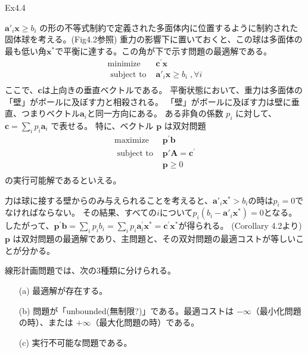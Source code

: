 \documentclass{jsarticle}
\begin{document}
Ex4.4\par 
$\bm{a}'_i\bm{x} \geq b_i$ の形の不等式制約で定義された多面体内に位置するように制約された固体球を考える。(Fig4.2参照) 
重力の影響下に置いておくと、この球は多面体の最も低い角$\bm{x}^*$で平衡に達する。この角が下で示す問題の最適解である。
\begin{equation}
  \begin{array}{cc}
  \operatorname{minimize} & \mathbf{c}^{\prime} \mathbf{x} \\
  \text { subject to } & \bm{a}'_i\bm{x} \geq b_i\;, \forall i\\
  \end{array}
\end{equation}
ここで、$\bm{c}$は上向きの垂直ベクトルである。
平衡状態において、重力は多面体の「壁」がボールに及ぼす力と相殺される。
「壁」がボールに及ぼす力は壁に垂直、つまりベクトル$\bm{a}_i$と同一方向にある。
ある非負の係数 $p_i$ に対して、$\bm{c} =\sum_i p_i\bm{a}_i$ で表せる。
特に、ベクトル $\bm{p}$ は双対問題
\begin{equation}
  \begin{array}{cc}
  \operatorname{maximize} & \mathbf{p}^{\prime} \mathbf{b} \\
  \text { subject to } & \mathbf{p'A}= \mathbf{c}^{\prime} \\
  & \bm{p}\geq 0\\
  \end{array}
\end{equation}
の実行可能解であるといえる。

力は球に接する壁からのみ与えられることを考えると、$\bm{a}'_i\bm{x}^*>b_i$の時は$p_i=0$でなければならない。
その結果、すべての$i$について$p_i(b_i - \bm{a}'_i\bm{x}^*)=0$となる。
したがって、$\mathbf{p}^{\prime} \mathbf{b}=\sum_{i} p_{i} b_{i}=\sum_{i} p_{i} \mathbf{a}_{i}^{\prime} \mathbf{x}^{*}=\mathbf{c}^{\prime} \mathbf{x}^{*}$が得られる。
(Corollary 4.2より)$\bm{p}$ は双対問題の最適解であり、主問題と、その双対問題の最適コストが等しいことが分かる。

\newpage
線形計画問題では、次の3種類に分けられる。
\begin{itemize}
  \item[(a)] 最適解が存在する。
  \item[(b)] 問題が「unbounded(無制限?)」である。最適コストは $-\infty$（最小化問題の時）、または $+\infty$（最大化問題の時）である。
  \item[(c)] 実行不可能な問題である。
\end{itemize}
\end{document}
